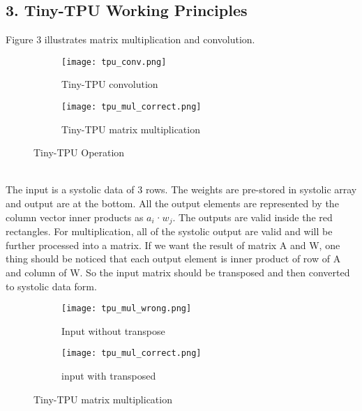 \documentclass[12pt]{article}
\begin{document}
\subsection*{3. Tiny-TPU Working Principles}
Figure 3 illustrates matrix multiplication and convolution.\\
\begin{figure}[h]
\begin{center}
\begin{subfigure}{0.4\textwidth}
\begin{center}
\texttt{[image: tpu\_conv.png]} 
\caption{Tiny-TPU convolution}
\label{fig:subim1}
\end{center}
\end{subfigure}
\begin{subfigure}{0.4\textwidth}
\begin{center}
\texttt{[image: tpu\_mul\_correct.png]}
\caption{Tiny-TPU matrix multiplication}
\label{fig:subim2}
\end{center}
\end{subfigure}
\end{center}
\caption{Tiny-TPU Operation}
\label{fig:image2}
\end{figure}
\\ 
The input is a systolic data of 3 rows. The weights are pre-stored in systolic array and output are at the bottom. All the output elements are represented by the column vector inner products as $a_i$·$w_j$. The outputs are valid inside the red rectangles. For multiplication, all of the systolic output are valid and will be further processed into a matrix. If we want the result of matrix A and W, one thing should be noticed that each output element is inner product of row of A and column of W. So the input matrix should be transposed and then converted to systolic data form.\\
\begin{figure}[h]
\begin{center}
\begin{subfigure}{0.4\textwidth}
\begin{center}
\texttt{[image: tpu\_mul\_wrong.png]} 
\caption{Input without transpose}
\label{fig:subim1}
\end{center}
\end{subfigure}
\begin{subfigure}{0.4\textwidth}
\begin{center}
\texttt{[image: tpu\_mul\_correct.png]}
\caption{input with transposed}
\label{fig:subim2}
\end{center}
\end{subfigure}
\end{center}
\caption{Tiny-TPU matrix multiplication}
\label{fig:image2}
\end{figure}
\end{document}
